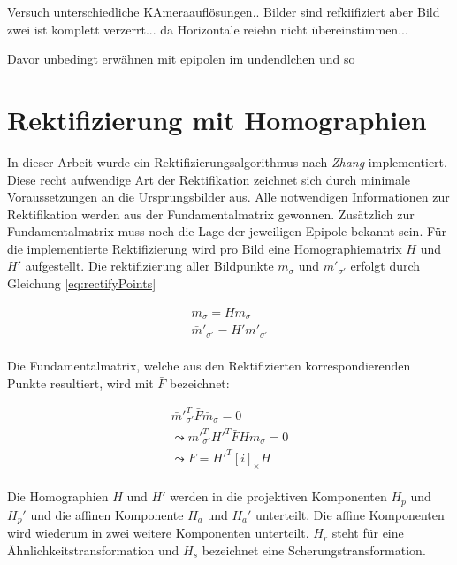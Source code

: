 Versuch unterschiedliche KAmeraauflösungen.. Bilder sind refkiifiziert aber Bild zwei ist komplett verzerrt... da Horizontale reiehn nicht übereinstimmen... 


Davor unbedingt erwähnen mit epipolen im undendlchen und so

\section{Rektifizierung mit Homographien}

In dieser Arbeit wurde ein Rektifizierungsalgorithmus nach \textit{Zhang}\cite{ZZ} implementiert. Diese recht aufwendige Art der Rektifikation zeichnet sich durch minimale Voraussetzungen an die Ursprungsbilder aus. Alle notwendigen Informationen zur Rektifikation werden aus der Fundamentalmatrix gewonnen. Zusätzlich zur Fundamentalmatrix muss noch die Lage der jeweiligen Epipole bekannt sein\cite{phdextrinsicPara}. Für die implementierte Rektifizierung wird pro Bild eine Homographiematrix $H$ und $H'$ aufgestellt. Die rektifizierung aller Bildpunkte $m_\sigma$ und $m'_{\sigma'}$ erfolgt durch Gleichung \ref{eq:rectifyPoints}


\begin{gather}
	\bar{m}_\sigma= H m_\sigma\\ \label{eq:rectifyPoints}
	\bar{m}'_{\sigma'}= H'm'_{\sigma'}
\end{gather}\\ 


Die Fundamentalmatrix, welche aus den Rektifizierten korrespondierenden Punkte resultiert, wird mit $\bar{F}$ bezeichnet\cite{ZZ,phdextrinsicPara}:


\begin{gather}
	\bar{m}'^T_{\sigma'}\bar{F}\bar{m}_\sigma = 0\\
	\leadsto m'^T_{\sigma'}H'^T\bar{F}Hm_\sigma=0\\	
	\leadsto F = H'^T[i]_\times H	
\end{gather}\\


Die Homographien $H$ und $H'$ werden in die projektiven Komponenten $H_p$ und $H_p'$ und die affinen Komponente $H_a$ und $H_a'$ unterteilt. Die affine Komponenten wird wiederum in zwei weitere Komponenten unterteilt. $H_r$ steht für eine Ähnlichkeitstransformation und $H_s$ bezeichnet eine Scherungstransformation\cite{ZZ,phdextrinsicPara}.


